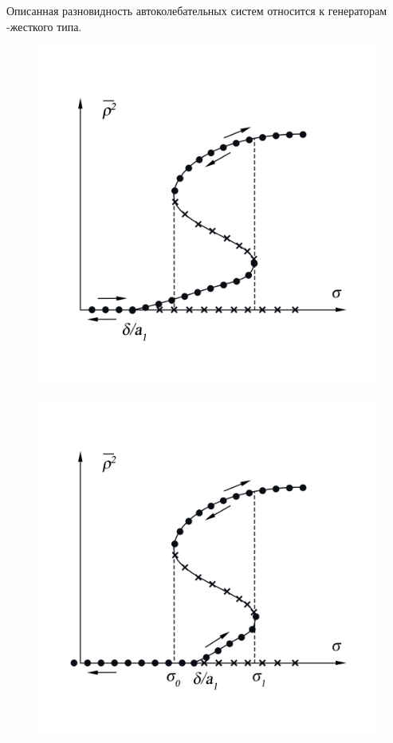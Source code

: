 Описанная разновидность автоколебательных систем относится к генераторам {-жесткого типа}.
\begin{center}
    \begin{figure}[h!]
        \vspace{-10pt}
        \begin{minipage}{0.49\linewidth}
            \includegraphics[width=\linewidth]{photo/pics/Ris12a.png} 
            \vspace{-50pt}
            \label{fig:14}
        \end{minipage}
    \begin{minipage}{0.49\linewidth}
        \includegraphics[width=\linewidth]{photo/pics/Ris12b.png} 

\end{minipage}
\end{figure}
\end{center}
